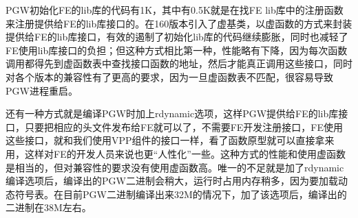 \documentclass[a4paper, 12pt, titlepage]{article}
\begin{document}
PGW初始化FE的lib库的代码有1K，其中有0.5K就是在找FE lib库中的注册函数来注册提供给FE的lib库接口的。在160版本引入了虚基类，以虚函数的方式来封装提供给FE的lib库接口，有效的遏制了初始化lib库的代码继续膨胀，同时也减轻了FE使用lib库接口的负担；但这种方式相比第一种，性能略有下降，因为每次函数调用都得先到虚函数表中查找接口函数的地址，然后才能真正调用这些接口，同时对各个版本的兼容性有了更高的要求，因为一旦虚函数表不匹配，很容易导致PGW进程重启。

还有一种方式就是编译PGW时加上rdynamic选项，这样PGW提供给FE的lib库接口，只要把相应的头文件发布给FE就可以了，不需要FE开发注册接口，FE使用这些接口，就和我们使用VPP组件的接口一样，看了函数原型就可以直接拿来用，这样对FE的开发人员来说也更“人性化”一些。这种方式的性能和使用虚函数是相当的，但对兼容性的要求没有使用虚函数高。唯一的不足就是加了rdynamic编译选项后，编译出的PGW二进制会稍大，运行时占用内存稍多，因为要加载动态符号表。在目前PGW二进制编译出来32M的情况下，加了该选项后，编译出的二进制在38M左右。
\end{document}
